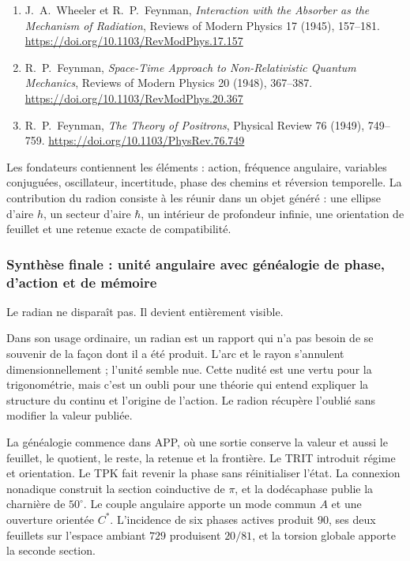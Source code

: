 \begin{enumerate}
\item\hypertarget{radionbib:WheelerFeynman1945}{}
J.~A.~Wheeler et R.~P.~Feynman,
\emph{Interaction with the Absorber as the Mechanism of Radiation},
Reviews of Modern Physics 17 (1945), 157--181.
\url{https://doi.org/10.1103/RevModPhys.17.157}

\item\hypertarget{radionbib:Feynman1948}{}
R.~P.~Feynman,
\emph{Space-Time Approach to Non-Relativistic Quantum Mechanics},
Reviews of Modern Physics 20 (1948), 367--387.
\url{https://doi.org/10.1103/RevModPhys.20.367}

\item\hypertarget{radionbib:Feynman1949}{}
R.~P.~Feynman,
\emph{The Theory of Positrons},
Physical Review 76 (1949), 749--759.
\url{https://doi.org/10.1103/PhysRev.76.749}
\end{enumerate}

\begin{narrativebox}
Les fondateurs contiennent les éléments : action, fréquence angulaire, variables
conjuguées, oscillateur, incertitude, phase des chemins et réversion temporelle.
La contribution du radion consiste à les réunir dans un objet généré : une ellipse
d'aire \(h\), un secteur d'aire \(\hbar\), un intérieur de profondeur infinie,
une orientation de feuillet et une retenue exacte de compatibilité.
\end{narrativebox}
\subsubsection{Synthèse finale : unité angulaire avec généalogie de phase, d'action et de mémoire}

Le radian ne disparaît pas. Il devient entièrement visible.

Dans son usage ordinaire, un radian est un rapport qui n'a pas besoin de se souvenir de la façon dont il a été
produit. L'arc et le rayon s'annulent dimensionnellement ; l'unité semble
nue. Cette nudité est une vertu pour la trigonométrie, mais c'est un oubli
pour une théorie qui entend expliquer la structure du continu et l'origine
de l'action. Le radion récupère l'oublié sans modifier la valeur publiée.

La généalogie commence dans APP, où une sortie conserve la valeur et aussi
le feuillet, le quotient, le reste, la retenue et la frontière. Le TRIT introduit régime et
orientation. Le TPK fait revenir la phase sans réinitialiser l'état. La connexion
nonadique construit la section coinductive de \(\pi\), et la dodécaphase publie
la charnière de \(50^\circ\). Le couple angulaire apporte un mode commun \(A\) et une
ouverture orientée \(C^*\). L'incidence de six phases actives produit
\(90\), ses deux feuillets sur l'espace ambiant \(729\) produisent \(20/81\), et la
torsion globale apporte la seconde section.

